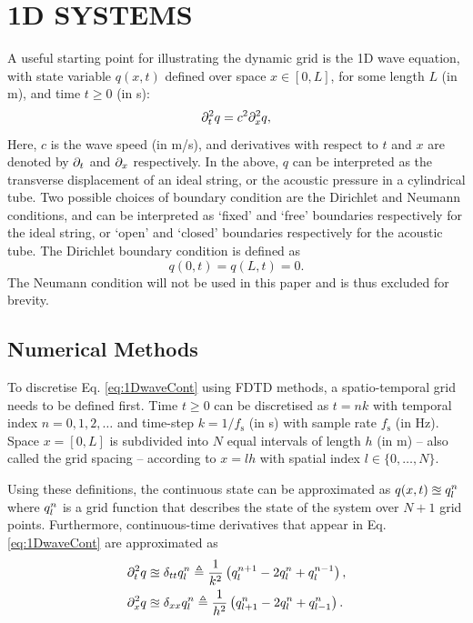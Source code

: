 \documentclass[fleqn]{jaes}
\begin{document}
\section{1D SYSTEMS}\label{sec:continuous}
A useful starting point for illustrating the dynamic grid is the 1D wave equation, with state variable $q(x, t)$ defined over space $x \in [0, L]$, for some length $L$ (in m), and time $t \geq 0$ (in s):
\begin{equation}\label{eq:1DwaveCont}
    \ptt q = c^2 \pxx q,
\end{equation}
Here, $c$  is the wave speed (in m/s), and derivatives with respect to $t$ and $x$ are denoted by $\partial_t$ and $\partial_x$ respectively. In the above, $q$ can be interpreted as the transverse displacement of an ideal string, or the acoustic pressure in a cylindrical tube. Two possible choices of boundary condition are the Dirichlet and Neumann conditions, and can be interpreted as `fixed' and `free' boundaries respectively for the ideal string, or `open' and `closed' boundaries respectively for the acoustic tube. The Dirichlet boundary condition is defined as
\begin{equation}%
    q(0, t) = q(L, t) = 0.\label{eq:contDirichlet}
\end{equation}
The Neumann condition will not be used in this paper and is thus excluded for brevity. 
\subsection{Numerical Methods}\label{sec:numericalMethods}
To discretise Eq. \eqref{eq:1DwaveCont} using FDTD methods, a spatio-temporal grid needs to be defined first. 
Time $t\geq 0$ can be discretised as $t = nk$ with temporal index $n = 0, 1, 2, \hdots$ and time-step $k = 1/f_\text{s}$ (in s) with sample rate $f_\text{s}$ (in Hz). Space $x = [0, L]$ is subdivided into $N$ equal intervals of length $h$ (in m) -- also called the grid spacing -- according to $x = lh$ with spatial index $l\in \{0, \hdots, N\}$. 

Using these definitions, the continuous state can be approximated as $q(x,t) \approxeq q_l^n$ where $q_l^n$ is a grid function that describes the state of the system over $N+1$ grid points. Furthermore, continuous-time derivatives that appear in Eq. \eqref{eq:1DwaveCont} are approximated as
\begin{subequations}
\begin{align}
    \partial_t^2 q &\approxeq \delta_{tt} q_l^n \triangleq \frac{1}{k^2}\left(q_l^{n+1} - 2 q_l^n + q_l^{n-1}\right),\\
    \partial_x^2 q &\approxeq \delta_{xx} q_l^n \triangleq \frac{1}{h^2}\left(q_{l+1}^n - 2 q_l^n + q_{l-1}^n\right).
\end{align}
\end{subequations}
\end{document}
